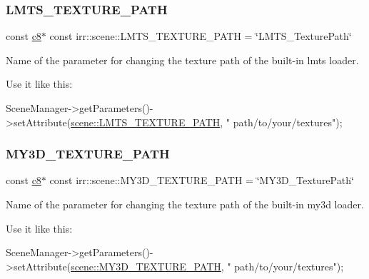 \subsubsection{\texorpdfstring{L\+M\+T\+S\+\_\+\+T\+E\+X\+T\+U\+R\+E\+\_\+\+P\+A\+TH}{LMTS\_TEXTURE\_PATH}}
{\footnotesize\ttfamily const \hyperlink{namespaceirr_a9395eaea339bcb546b319e9c96bf7410}{c8}$\ast$ const irr\+::scene\+::\+L\+M\+T\+S\+\_\+\+T\+E\+X\+T\+U\+R\+E\+\_\+\+P\+A\+TH = \char`\"{}L\+M\+T\+S\+\_\+\+Texture\+Path\char`\"{}}



Name of the parameter for changing the texture path of the built-\/in lmts loader. 

Use it like this\+: 
\begin{DoxyCode}
SceneManager->getParameters()->setAttribute(\hyperlink{namespaceirr_1_1scene_a1d81a2ac8866dfa4a0ff3bdece327f75}{scene::LMTS\_TEXTURE\_PATH}, \textcolor{stringliteral}{"
      path/to/your/textures"});
\end{DoxyCode}
 \mbox{\label{namespaceirr_1_1scene_a54eb9ea68ba13b4689444f8d34e338b9}} 
\subsubsection{\texorpdfstring{M\+Y3\+D\+\_\+\+T\+E\+X\+T\+U\+R\+E\+\_\+\+P\+A\+TH}{MY3D\_TEXTURE\_PATH}}
{\footnotesize\ttfamily const \hyperlink{namespaceirr_a9395eaea339bcb546b319e9c96bf7410}{c8}$\ast$ const irr\+::scene\+::\+M\+Y3\+D\+\_\+\+T\+E\+X\+T\+U\+R\+E\+\_\+\+P\+A\+TH = \char`\"{}M\+Y3\+D\+\_\+\+Texture\+Path\char`\"{}}



Name of the parameter for changing the texture path of the built-\/in my3d loader. 

Use it like this\+: 
\begin{DoxyCode}
SceneManager->getParameters()->setAttribute(\hyperlink{namespaceirr_1_1scene_a54eb9ea68ba13b4689444f8d34e338b9}{scene::MY3D\_TEXTURE\_PATH}, \textcolor{stringliteral}{"
      path/to/your/textures"});
\end{DoxyCode}
 \mbox{\label{namespaceirr_1_1scene_afb0c389302c1e7ad39f83d558dbb2699}} 
